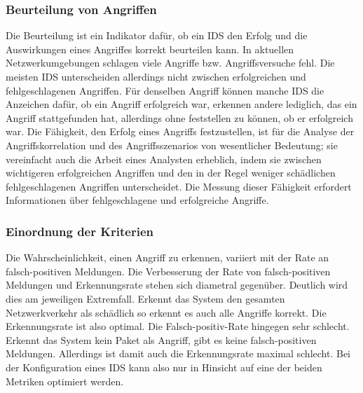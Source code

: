 \subsubsection{Beurteilung von Angriffen}
Die Beurteilung ist ein Indikator dafür, ob ein IDS den Erfolg und die Auswirkungen eines Angriffes korrekt beurteilen kann. In aktuellen Netzwerkumgebungen schlagen viele Angriffe bzw. Angriffsversuche fehl. Die meisten IDS unterscheiden allerdings nicht zwischen erfolgreichen und fehlgeschlagenen Angriffen. Für denselben Angriff können manche IDS die Anzeichen dafür, ob ein Angriff erfolgreich war, erkennen andere lediglich, das ein Angriff stattgefunden hat, allerdings ohne feststellen zu können, ob er erfolgreich war. Die Fähigkeit, den Erfolg eines Angriffs festzustellen, ist für die Analyse der Angriffskorrelation und des Angriffsszenarios von wesentlicher Bedeutung; sie vereinfacht auch die Arbeit eines Analysten erheblich, indem sie zwischen wichtigeren erfolgreichen Angriffen und den in der Regel weniger schädlichen fehlgeschlagenen Angriffen unterscheidet. Die Messung dieser Fähigkeit erfordert Informationen über fehlgeschlagene und erfolgreiche Angriffe.

\subsubsection{Einordnung der Kriterien}
Die Wahrscheinlichkeit, einen Angriff zu erkennen, variiert mit der Rate an falsch-positiven Meldungen. Die Verbesserung der Rate von falsch-positiven Meldungen und Erkennungsrate stehen sich diametral gegenüber. Deutlich wird dies am jeweiligen Extremfall. Erkennt das System den gesamten Netzwerkverkehr als schädlich so erkennt es auch alle Angriffe korrekt. Die Erkennungsrate ist also optimal. Die Falsch-positiv-Rate hingegen sehr schlecht. Erkennt das System kein Paket als Angriff, gibt es keine falsch-positiven Meldungen. Allerdings ist damit auch die Erkennungsrate maximal schlecht. Bei der Konfiguration eines IDS kann also nur in Hinsicht auf eine der beiden Metriken optimiert werden.

